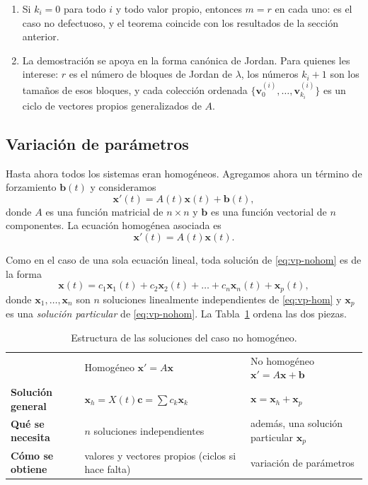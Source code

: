 \begin{remark}
\begin{enumerate}
    \item Si $k_i = 0$ para todo $i$ y todo valor propio, entonces $m=r$ en cada uno: es el caso no defectuoso, y el teorema coincide con los resultados de la secci\'on anterior.

    \item La demostraci\'on se apoya en la forma can\'onica de Jordan. Para quienes les interese: $r$ es el n\'umero de bloques de Jordan de $\lambda$, los n\'umeros $k_i + 1$ son los tama\~nos de esos bloques, y cada colecci\'on ordenada $\{\mathbf{v}_0^{(i)}, \dots, \mathbf{v}_{k_i}^{(i)}\}$ es un ciclo de vectores propios generalizados de $A$.
\end{enumerate}
\end{remark}

\subsection{Variaci\'on de par\'ametros}

Hasta ahora todos los sistemas eran homog\'eneos. Agregamos ahora un t\'ermino de forzamiento $\mathbf b(t)$ y consideramos
\begin{equation}\label{eq:vp-nohom}
\mathbf{x}'(t) = A(t)\mathbf{x}(t) + \mathbf{b}(t),
\end{equation}
donde $A$ es una funci\'on matricial de $n \times n$ y $\mathbf{b}$ es una funci\'on vectorial de $n$ componentes. La ecuaci\'on homog\'enea asociada es
\begin{equation}\label{eq:vp-hom}
\mathbf{x}'(t) = A(t)\mathbf{x}(t).
\end{equation}

Como en el caso de una sola ecuaci\'on lineal, toda soluci\'on de \eqref{eq:vp-nohom} es de la forma
\[
\mathbf{x}(t) = c_1\mathbf{x}_1(t) + c_2\mathbf{x}_2(t) + \dots + c_n\mathbf{x}_n(t) + \mathbf{x}_p(t),
\]
donde $\mathbf{x}_1, \dots, \mathbf{x}_n$ son $n$ soluciones linealmente independientes de \eqref{eq:vp-hom} y $\mathbf{x}_p$ es una \textit{soluci\'on particular} de \eqref{eq:vp-nohom}. La Tabla~\ref{tab:vp-estructura} ordena las dos piezas.

\begin{table}[H]
\centering
\renewcommand{\arraystretch}{1.4}
\begin{tabular}{>{\bfseries}l l l}
\rowcolor{bbe!15}
 & \textcolor{bbe}{Homog\'eneo $\mathbf x'=A\mathbf x$} & \textcolor{bbe}{No homog\'eneo $\mathbf x'=A\mathbf x+\mathbf b$} \\
Soluci\'on general & $\mathbf x_h=X(t)\mathbf c=\sum c_k\mathbf x_k$ & $\mathbf x=\mathbf x_h+\mathbf x_p$ \\
Qu\'e se necesita & $n$ soluciones independientes & adem\'as, una soluci\'on particular $\mathbf x_p$ \\
C\'omo se obtiene & valores y vectores propios (ciclos si hace falta) & variaci\'on de par\'ametros \\
\end{tabular}
\caption{Estructura de las soluciones del caso no homog\'eneo.}
\label{tab:vp-estructura}
\end{table}

